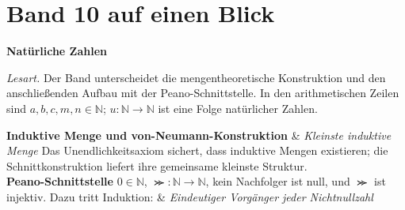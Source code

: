 \chapter[Band 10: Natürliche Zahlen]{Band 10 auf einen Blick}
\noindent\textbf{Natürliche Zahlen}\par\medskip
\noindent\emph{Lesart.} Der Band unterscheidet die mengentheoretische
Konstruktion und den anschließenden Aufbau mit der Peano-Schnittstelle.
In den arithmetischen Zeilen sind \(a,b,c,m,n\in\mathbb N\);
\(u\colon\mathbb N\to\mathbb N\) ist eine Folge natürlicher Zahlen.
\begin{BandUebersicht}
\textbf{Induktive Menge und von-Neumann-Konstruktion}
&
\textit{Kleinste induktive Menge}
Das Unendlichkeitsaxiom sichert, dass induktive Mengen existieren;
die Schnittkonstruktion liefert ihre gemeinsame kleinste Struktur.
\\
\addlinespace[.8ex]
\textbf{Peano-Schnittstelle}
\(0\in\mathbb N\), \(\Succ\colon\mathbb N\to\mathbb N\),
kein Nachfolger ist null, und \(\Succ\) ist injektiv. Dazu tritt Induktion:
&
\textit{Eindeutiger Vorgänger jeder Nichtnullzahl}
\end{BandUebersicht}
